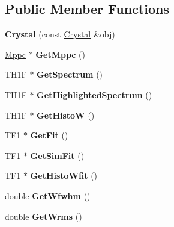\subsection*{Public Member Functions}
\begin{DoxyCompactItemize}
\item 
\hypertarget{classCrystal_abb5f724effb4f19e4e3abde2214f0b2f}{{\bfseries Crystal} (const \hyperlink{classCrystal}{Crystal} \&obj)}\label{classCrystal_abb5f724effb4f19e4e3abde2214f0b2f}

\item 
\hypertarget{classCrystal_af70f2647bde3546e79eedfd89710aaac}{\hyperlink{classMppc}{Mppc} $\ast$ {\bfseries Get\+Mppc} ()}\label{classCrystal_af70f2647bde3546e79eedfd89710aaac}

\item 
\hypertarget{classCrystal_a545ad3e5b0aa7181e2c8141483b2ec8e}{T\+H1\+F $\ast$ {\bfseries Get\+Spectrum} ()}\label{classCrystal_a545ad3e5b0aa7181e2c8141483b2ec8e}

\item 
\hypertarget{classCrystal_a302a058bd2f358532b5e5dedb4ef5af1}{T\+H1\+F $\ast$ {\bfseries Get\+Highlighted\+Spectrum} ()}\label{classCrystal_a302a058bd2f358532b5e5dedb4ef5af1}

\item 
\hypertarget{classCrystal_a1662dbae8a3b5d86e010f23ec0023b6b}{T\+H1\+F $\ast$ {\bfseries Get\+Histo\+W} ()}\label{classCrystal_a1662dbae8a3b5d86e010f23ec0023b6b}

\item 
\hypertarget{classCrystal_a00cb7461f242ace491e9be55e7a496e3}{T\+F1 $\ast$ {\bfseries Get\+Fit} ()}\label{classCrystal_a00cb7461f242ace491e9be55e7a496e3}

\item 
\hypertarget{classCrystal_adfc9e1c99c109c6b1656c1c160e1a5dd}{T\+F1 $\ast$ {\bfseries Get\+Sim\+Fit} ()}\label{classCrystal_adfc9e1c99c109c6b1656c1c160e1a5dd}

\item 
\hypertarget{classCrystal_a4d97a11a2bc42b235b336a6c305b9142}{T\+F1 $\ast$ {\bfseries Get\+Histo\+Wfit} ()}\label{classCrystal_a4d97a11a2bc42b235b336a6c305b9142}

\item 
\hypertarget{classCrystal_a290199b0343a255672fc281379a41af7}{double {\bfseries Get\+Wfwhm} ()}\label{classCrystal_a290199b0343a255672fc281379a41af7}

\item 
\hypertarget{classCrystal_adf1de11d276a43661582875060d04042}{double {\bfseries Get\+Wrms} ()}\label{classCrystal_adf1de11d276a43661582875060d04042}


\end{DoxyCompactItemize}
